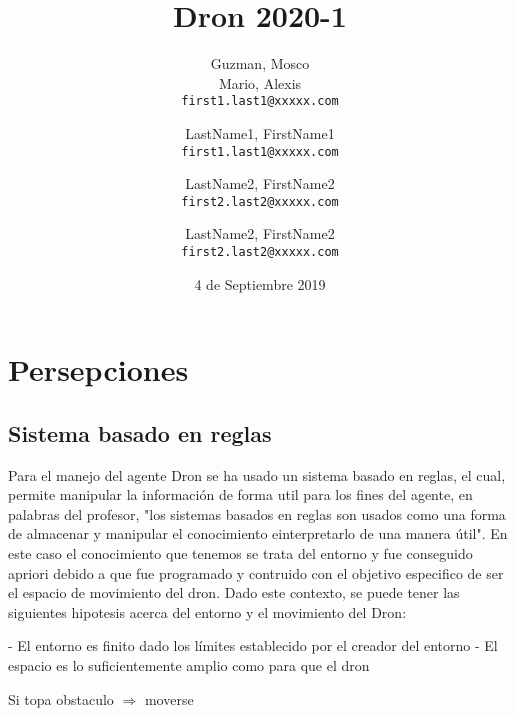 \documentclass{article}
\title{Dron 2020-1}
\author{
  Guzman, Mosco\\
  Mario, Alexis\\
  \texttt{first1.last1@xxxxx.com}
  \and  
  LastName1, FirstName1\\
  \texttt{first1.last1@xxxxx.com}
  \and
  LastName2, FirstName2\\
  \texttt{first2.last2@xxxxx.com}
  \and
  LastName2, FirstName2\\
  \texttt{first2.last2@xxxxx.com}
}
\date{4 de Septiembre 2019}
\begin{document}
\maketitle

\section{Persepciones}
\subsection{Sistema basado en reglas}
Para el manejo del agente Dron se ha usado un sistema basado en reglas, el cual, permite manipular la información de forma util para los fines del agente, en palabras del profesor, "los sistemas basados en reglas son usados como una forma de almacenar y manipular el conocimiento einterpretarlo de una manera útil".
En este caso el conocimiento que tenemos se trata del entorno y fue conseguido apriori  debido a que fue programado y contruido con el objetivo especifico de ser el espacio de movimiento del dron. Dado este contexto, se puede tener las siguientes hipotesis acerca del entorno y el movimiento del Dron:

- El entorno es finito dado los límites establecido por el creador del entorno
- El espacio es lo suficientemente amplio como para que el dron 

Si topa obstaculo $\Rightarrow$ moverse
\end{document}
